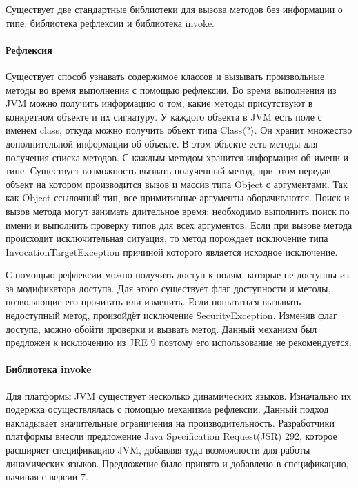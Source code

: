 Существует две стандартные библиотеки для вызова методов без информации о типе: библиотека рефлексии и библиотека invoke.
\paragraph{Рефлексия}
Существует способ узнавать содержимое классов и вызывать произвольные методы во время выполнения с помощью рефлексии\cite{jvm:reflection}. Во время выполнения из JVM можно получить информацию о том, какие методы присутствуют в конкретном объекте и их сигнатуру. У каждого объекта в JVM есть поле с именем class, откуда можно получить объект типа Class$\langle$?$\rangle$. Он хранит множество дополнительной информации об объекте. В этом объекте есть методы для получения списка методов. С каждым методом хранится информация об имени и типе. Существует возможность вызвать полученный метод, при этом передав объект на котором производится вызов и массив типа Object с аргументами. Так как Object ссылочный тип, все примитивные аргументы оборачиваются. Поиск и вызов метода могут занимать длительное время: необходимо выполнить поиск по имени и выполнить проверку типов для всех аргументов. Если при вызове метода происходит исключительная ситуация, то метод порождает исключение типа InvocationTargetException причиной которого является исходное исключение.

С помощью рефлексии можно получить доступ к полям, которые не доступны из-за модификатора доступа. Для этого существует флаг доступности и методы, позволяющие его прочитать или изменить. Если попытаться вызывать недоступный метод, произойдёт исключение SecurityException. Изменив флаг доступа, можно обойти проверки и вызвать метод. Данный механизм был предложен к исключению из JRE 9 поэтому его использование не рекомендуется.

\paragraph{Библиотека invoke}
Для платформы JVM существует несколько динамических языков. Изначально их подержка осуществлялась с помощью механизма рефлексии. Данный подход накладывает значительные ограничения на производительность. Разработчики платформы внесли предложение Java Specification Request(JSR) 292, которое расширяет спецификацию JVM, добавляя туда возможности для работы динамических языков\cite{jvm:jsr292}. Предложение было принято и добавлено в спецификацию, начиная с версии 7.

